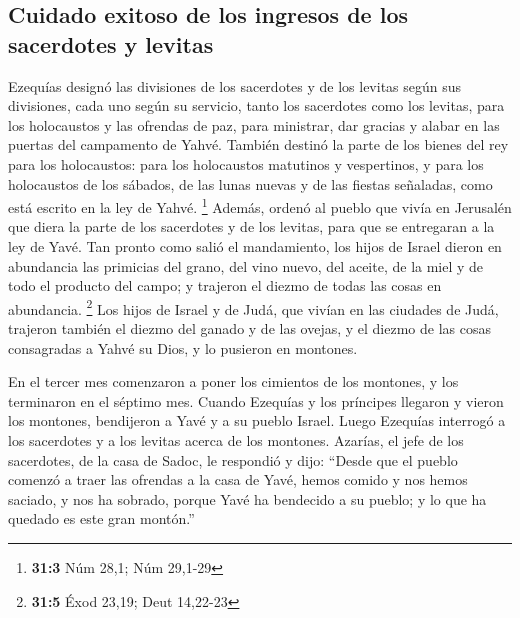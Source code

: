 \begin{paracol}{2}
\hypertarget{cuidado-exitoso-de-los-ingresos-de-los-sacerdotes-y-levitas}{%
\subsection{Cuidado exitoso de los ingresos de los sacerdotes y
levitas}\label{cuidado-exitoso-de-los-ingresos-de-los-sacerdotes-y-levitas}}

 Ezequías designó las divisiones de los sacerdotes y de
los levitas según sus divisiones, cada uno según su servicio, tanto los
sacerdotes como los levitas, para los holocaustos y las ofrendas de paz,
para ministrar, dar gracias y alabar en las puertas del campamento de
Yahvé.  También destinó la parte de los bienes del rey
para los holocaustos: para los holocaustos matutinos y vespertinos, y
para los holocaustos de los sábados, de las lunas nuevas y de las
fiestas señaladas, como está escrito en la ley de Yahvé. \footnote{\textbf{31:3}
  Núm 28,1; Núm 29,1-29}  Además, ordenó al pueblo que
vivía en Jerusalén que diera la parte de los sacerdotes y de los
levitas, para que se entregaran a la ley de Yavé.  Tan
pronto como salió el mandamiento, los hijos de Israel dieron en
abundancia las primicias del grano, del vino nuevo, del aceite, de la
miel y de todo el producto del campo; y trajeron el diezmo de todas las
cosas en abundancia. \footnote{\textbf{31:5} Éxod 23,19; Deut 14,22-23}
 Los hijos de Israel y de Judá, que vivían en las ciudades
de Judá, trajeron también el diezmo del ganado y de las ovejas, y el
diezmo de las cosas consagradas a Yahvé su Dios, y lo pusieron en
montones.

 En el tercer mes comenzaron a poner los cimientos de los
montones, y los terminaron en el séptimo mes.  Cuando
Ezequías y los príncipes llegaron y vieron los montones, bendijeron a
Yavé y a su pueblo Israel.  Luego Ezequías interrogó a los
sacerdotes y a los levitas acerca de los montones. 
Azarías, el jefe de los sacerdotes, de la casa de Sadoc, le respondió y
dijo: ``Desde que el pueblo comenzó a traer las ofrendas a la casa de
Yavé, hemos comido y nos hemos saciado, y nos ha sobrado, porque Yavé ha
bendecido a su pueblo; y lo que ha quedado es este gran montón.''


\end{paracol}
